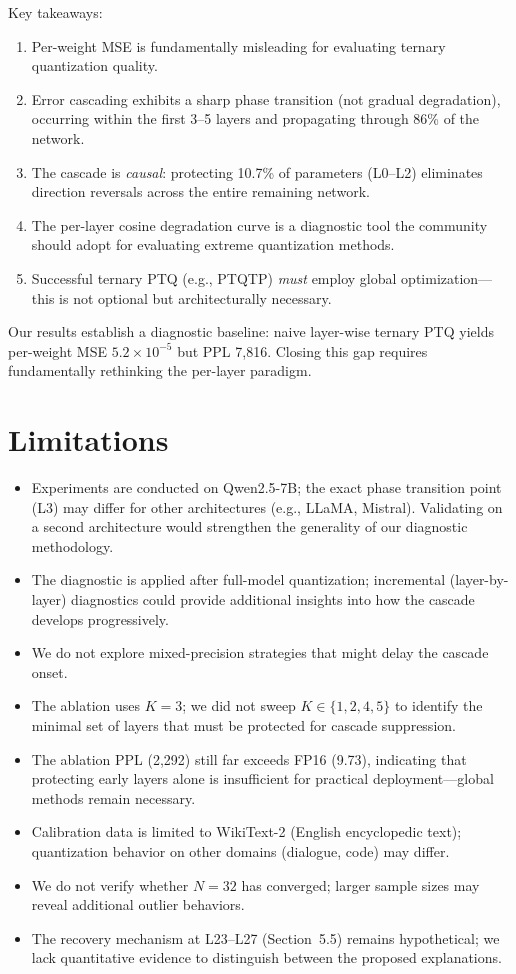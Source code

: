 \documentclass[10pt,a4paper]{article}
\begin{document}
Key takeaways:
\begin{enumerate}
    \item Per-weight MSE is fundamentally misleading for evaluating ternary quantization quality.
    \item Error cascading exhibits a sharp phase transition (not gradual degradation), occurring within the first 3--5 layers and propagating through 86\% of the network.
    \item The cascade is \textit{causal}: protecting 10.7\% of parameters (L0--L2) eliminates direction reversals across the entire remaining network.
    \item The per-layer cosine degradation curve is a diagnostic tool the community should adopt for evaluating extreme quantization methods.
    \item Successful ternary PTQ (e.g., PTQTP) \textit{must} employ global optimization---this is not optional but architecturally necessary.
\end{enumerate}

Our results establish a diagnostic baseline: naive layer-wise ternary PTQ yields per-weight MSE $5.2 \times 10^{-5}$ but PPL 7,816.
Closing this gap requires fundamentally rethinking the per-layer paradigm.

\section*{Limitations}

\begin{itemize}
    \item Experiments are conducted on Qwen2.5-7B; the exact phase transition point (L3) may differ for other architectures (e.g., LLaMA, Mistral). Validating on a second architecture would strengthen the generality of our diagnostic methodology.
    \item The diagnostic is applied after full-model quantization; incremental (layer-by-layer) diagnostics could provide additional insights into how the cascade develops progressively.
    \item We do not explore mixed-precision strategies that might delay the cascade onset.
    \item The ablation uses $K{=}3$; we did not sweep $K \in \{1, 2, 4, 5\}$ to identify the minimal set of layers that must be protected for cascade suppression.
    \item The ablation PPL (2,292) still far exceeds FP16 (9.73), indicating that protecting early layers alone is insufficient for practical deployment---global methods remain necessary.
    \item Calibration data is limited to WikiText-2 (English encyclopedic text); quantization behavior on other domains (dialogue, code) may differ.
    \item We do not verify whether $N{=}32$ has converged; larger sample sizes may reveal additional outlier behaviors.
    \item The recovery mechanism at L23--L27 (Section~5.5) remains hypothetical; we lack quantitative evidence to distinguish between the proposed explanations.
\end{itemize}
\end{document}
